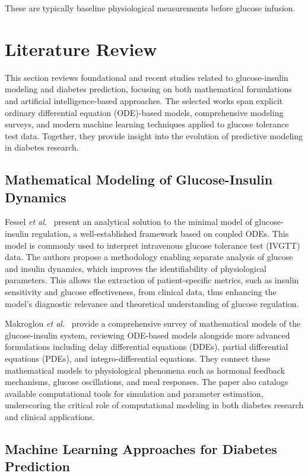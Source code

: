 \documentclass[conference]{IEEEtran}
\begin{document}
These are typically baseline physiological measurements before glucose infusion.
\section{Literature Review}

This section reviews foundational and recent studies related to glucose-insulin modeling and diabetes prediction, focusing on both mathematical formulations and artificial intelligence-based approaches. The selected works span explicit ordinary differential equation (ODE)-based models, comprehensive modeling surveys, and modern machine learning techniques applied to glucose tolerance test data. Together, they provide insight into the evolution of predictive modeling in diabetes research.

\subsection{Mathematical Modeling of Glucose-Insulin Dynamics}

Fessel \textit{et al.}~\cite{fessel2016} present an analytical solution to the minimal model of glucose-insulin regulation, a well-established framework based on coupled ODEs. This model is commonly used to interpret intravenous glucose tolerance test (IVGTT) data. The authors propose a methodology enabling separate analysis of glucose and insulin dynamics, which improves the identifiability of physiological parameters. This allows the extraction of patient-specific metrics, such as insulin sensitivity and glucose effectiveness, from clinical data, thus enhancing the model’s diagnostic relevance and theoretical understanding of glucose regulation.




Makroglou \textit{et al.}~\cite{makroglou2006} provide a comprehensive survey of mathematical models of the glucose-insulin system, reviewing ODE-based models alongside more advanced formulations including delay differential equations (DDEs), partial differential equations (PDEs), and integro-differential equations. They connect these mathematical models to physiological phenomena such as hormonal feedback mechanisms, glucose oscillations, and meal responses. The paper also catalogs available computational tools for simulation and parameter estimation, underscoring the critical role of computational modeling in both diabetes research and clinical applications.

\subsection{Machine Learning Approaches for Diabetes Prediction}
\end{document}
